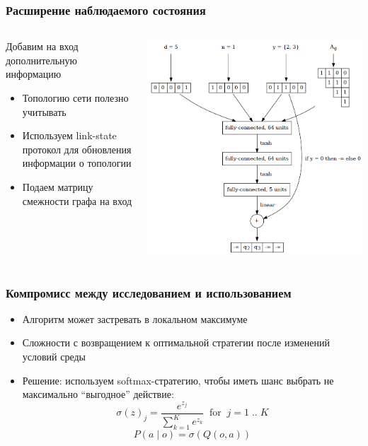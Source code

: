 \documentclass{beamer}
\begin{document}
\begin{frame}
  \frametitle{Расширение наблюдаемого состояния}
  \begin{columns}
    \begin{column}{0.5\textwidth}
      Добавим на вход дополнительную информацию
      \begin{itemize}
      \item Топологию сети полезно учитывать
      \item Используем link-state протокол для обновления информации о топологии
      \item Подаем матрицу смежности графа на вход
      \end{itemize}
    \end{column}
    \begin{column}{0.5\textwidth}
      \begin{center}
        \includegraphics[width=\textwidth]{nn-2}
      \end{center}
    \end{column}
  \end{columns}
\end{frame}


\begin{frame}
  \frametitle{Компромисс между исследованием и использованием}
  \begin{itemize}
  \item Алгоритм может застревать в локальном максимуме
  \item Сложности с возвращением к оптимальной стратегии после изменений условий среды
  \item Решение: используем softmax-стратегию, чтобы иметь шанс выбрать не максимально ``выгодное'' действие:
    \[
    \sigma(z)_j = \frac{e^{z_j}}{\sum_{k=1}^K {e^{z_k}}} \; \; \mathrm{for} \; \; j
    = 1 \; .. \; K
    \]
    \[
    P(a \; | \; o) = \sigma(Q(o, a)) 
    \]
  \end{itemize}
\end{frame}
\end{document}
